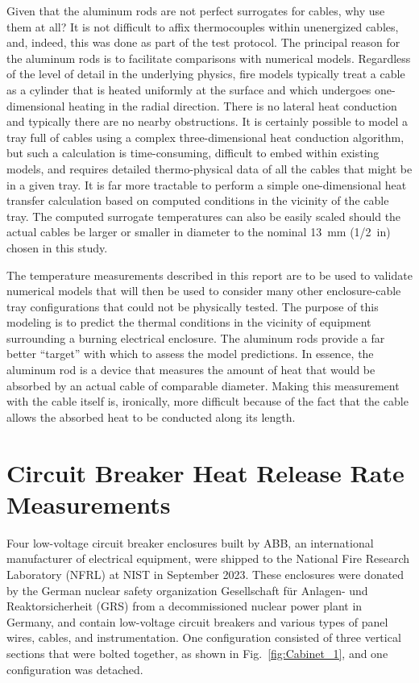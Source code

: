 Given that the aluminum rods are not perfect surrogates for cables, why use them at all? It is not difficult to affix thermocouples within unenergized cables, and, indeed, this was done as part of the test protocol. The principal reason for the aluminum rods is to facilitate comparisons with numerical models. Regardless of the level of detail in the underlying physics, fire models typically treat a cable as a cylinder that is heated uniformly at the surface and which undergoes one-dimensional heating in the radial direction. There is no lateral heat conduction and typically there are no nearby obstructions. It is certainly possible to model a tray full of cables using a complex three-dimensional heat conduction algorithm, but such a calculation is time-consuming, difficult to embed within existing models, and requires detailed thermo-physical data of all the cables that might be in a given tray. It is far more tractable to perform a simple one-dimensional heat transfer calculation based on computed conditions in the vicinity of the cable tray. The computed surrogate temperatures can also be easily scaled should the actual cables be larger or smaller in diameter to the nominal 13~mm (1/2~in) chosen in this study. 

The temperature measurements described in this report are to be used to validate numerical models that will then be used to consider many other enclosure-cable tray configurations that could not be physically tested. The purpose of this modeling is to predict the thermal conditions in the vicinity of equipment surrounding a burning electrical enclosure. The aluminum rods provide a far better ``target'' with which to assess the model predictions. In essence, the aluminum rod is a device that measures the amount of heat that would be absorbed by an actual cable of comparable diameter. Making this measurement with the cable itself is, ironically, more difficult because of the fact that the cable allows the absorbed heat to be conducted along its length.

\newpage

\section{Circuit Breaker Heat Release Rate Measurements}
\label{Sec:Circuit Breakers}

Four low-voltage circuit breaker enclosures built by ABB, an international manufacturer of electrical equipment, were shipped to the National Fire Research Laboratory (NFRL) at NIST in September 2023. These enclosures were donated by the German nuclear safety organization Gesellschaft für Anlagen- und Reaktorsicherheit (GRS) from a decommissioned nuclear power plant in Germany, and contain low-voltage circuit breakers and various types of panel wires, cables, and instrumentation. One configuration consisted of three vertical sections that were bolted together, as shown in Fig.~\ref{fig:Cabinet_1}, and one configuration was detached.

